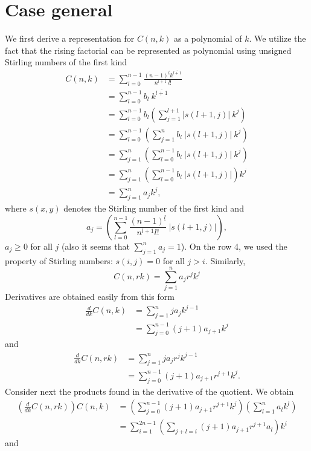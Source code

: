 \documentclass[12pt]{article}
\newcommand{\Le}{\left(}
\newcommand{\Ri}{\right)}
\begin{document}
\section{Case general}
We first derive a representation for $C(n,k)$ as a polynomial of $k$. We utilize the fact that the rising factorial can be represented as polynomial using unsigned Stirling numbers of the first kind
\begin{align*}
C(n,k) &=  \sum_{l=0}^{n-1}\frac{(n-1)^{\underline{l}}k^{\overline{l + 1}}}{n^{l+1} \ l!} \\
&= \sum_{l=0}^{n-1} b_l \ k^{\overline{l+1}} \\
&= \sum_{l=0}^{n-1} b_l \Le \sum_{j=1}^{l+1}|s(l + 1,j)| \ k^j \Ri \\
&= \sum_{l=0}^{n-1} \Le \sum_{j=1}^{n}b_l \ |s(l + 1,j)| \ k^j \Ri \\
&= \sum_{j=1}^{n} \Le \sum_{l=0}^{n-1} b_l \ |s(l + 1,j)| \ k^j \Ri \\
&= \sum_{j=1}^{n} \Le \sum_{l=0}^{n-1} b_l \ |s(l + 1,j)| \Ri k^j \\
&= \sum_{j=1}^{n} a_j  k^j,
\end{align*}where $s(x,y)$ denotes the Stirling number of the first kind and
$$
a_j = \Le \sum_{l=0}^{n-1} \frac{(n-1)^{\underline{l}}}{n^{l+1}l!} \ |s(l + 1,j)| \Ri,
$$ $a_j \geq 0$ for all $j$ (also it seems that $\sum_{j=1}^n a_j = 1 $). On the row 4, we used the property of Stirling numbers: $s(i,j) = 0$ for all $j > i$. Similarly,
$$
C(n,rk) = \sum_{j=1}^{n} a_j  r^jk^j
$$Derivatives are obtained easily from this form
\begin{align*}
\frac{d}{dk}C(n,k) &= \sum_{j=1}^{n}ja_jk^{j-1} \\
&= \sum_{j=0}^{n-1}(j+1) a_{j+1}k^{j}
\end{align*}and
\begin{align*}
\frac{d}{dk}C(n,rk) &= \sum_{j=1}^{n}ja_jr^jk^{j-1} \\
&= \sum_{j=0}^{n-1}(j+1)a_{j+1}r^{j+1}k^{j}. 
\end{align*}Consider next the products found in the derivative of the quotient. We obtain
\begin{align*}
\Le\frac{d}{dk}C(n,rk)\Ri C(n,k) &= \Le \sum_{j=0}^{n-1}(j+1)a_{j+1}r^{j+1}k^{j} \Ri \Le \sum_{l=1}^{n} a_l  k^l \Ri \\
&= \sum_{i = 1}^{2n-1} \Le \sum_{j+l = i} (j+1)a_{j+1}r^{j+1}a_l  \Ri k^i
\end{align*}and
\end{document}

